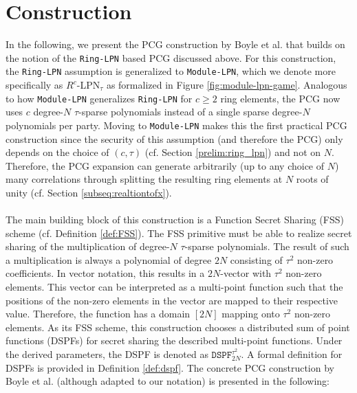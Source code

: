 \section{Construction}
\label{sec:construction}
In the following, we present the PCG construction by Boyle et al. \cite{boyle2020efficient} that builds on the notion of the \texttt{Ring-LPN} based PCG discussed above. For this construction, the \texttt{Ring-LPN} assumption is generalized to \texttt{Module-LPN}, which we denote more specifically as $R^{c}$-LPN$_{\tau}$ as formalized in Figure \ref{fig:module-lpn-game}. 
Analogous to how \texttt{Module-LPN} generalizes \texttt{Ring-LPN} for $c \geq 2$ ring elements, the PCG now uses $c$ degree-$N$ $\tau$-sparse polynomials instead of a single sparse degree-$N$ polynomials per party. Moving to \texttt{Module-LPN} makes this the first practical PCG construction since the security of this assumption (and therefore the PCG) only depends on the choice of $(c,\tau)$ (cf. Section \ref{prelim:ring_lpn}) and not on $N$. Therefore, the PCG expansion can generate arbitrarily (up to any choice of $N$) many correlations through splitting the resulting ring elements at $N$ roots of unity (cf. Section \ref{subseq:realtiontofx}).
\\\\
The main building block of this construction is a Function Secret Sharing (FSS) scheme (cf. Definition \ref{def:FSS}). The FSS primitive must be able to realize secret sharing of the multiplication of degree-$N$ $\tau$-sparse polynomials. The result of such a multiplication is always a polynomial of degree $2N$ consisting of $\tau^2$ non-zero coefficients. In vector notation, this results in a $2N$-vector with $\tau^2$ non-zero elements. This vector can be interpreted as a multi-point function such that the positions of the non-zero elements in the vector are mapped to their respective value. Therefore, the function has a domain $[2N]$ mapping onto $\tau^2$ non-zero elements. As its FSS scheme, this construction chooses a distributed sum of point functions (DSPFs) for secret sharing the described multi-point functions. Under the derived parameters, the DSPF is denoted as $\texttt{DSPF}^{\tau^2}_{2N}$. A formal definition for DSPFs is provided in Definition \ref{def:dspf}. The concrete PCG construction by Boyle et al. \cite{boyle2020efficient} (although adapted to our notation) is presented in the following:

